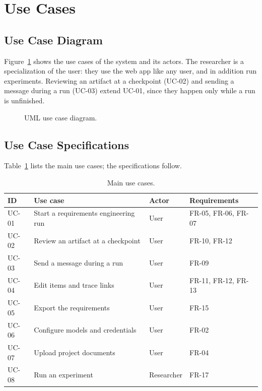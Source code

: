 \section{Use Cases}
\label{sec:sd-use-cases}

\subsection{Use Case Diagram}
\label{sec:sd-uc-diagram}
Figure~\ref{fig:sd-use-case} shows the use cases of the system and its actors. The researcher is a specialization of the user: they use the web app like any user, and in addition run experiments. Reviewing an artifact at a checkpoint (UC-02) and sending a message during a run (UC-03) extend UC-01, since they happen only while a run is unfinished.

\begin{figure}[H]
    \centering
    \resizebox{\linewidth}{!}{}
    \caption{UML use case diagram.}
    \label{fig:sd-use-case}
\end{figure}

\subsection{Use Case Specifications}
\label{sec:sd-uc-specs}
Table~\ref{tab:sd-uc-list} lists the main use cases; the specifications follow.

\begin{table}[H]
    \centering
    \caption{Main use cases.}
    \label{tab:sd-uc-list}
    \begin{tabularx}{\linewidth}{|l|X|l|l|}
        \hline
        \textbf{ID} & \textbf{Use case} & \textbf{Actor} & \textbf{Requirements} \\
        \hline
        UC-01 & Start a requirements engineering run & User & FR-05, FR-06, FR-07 \\
        UC-02 & Review an artifact at a checkpoint & User & FR-10, FR-12 \\
        UC-03 & Send a message during a run & User & FR-09 \\
        UC-04 & Edit items and trace links & User & FR-11, FR-12, FR-13 \\
        UC-05 & Export the requirements & User & FR-15 \\
        UC-06 & Configure models and credentials & User & FR-02 \\
        UC-07 & Upload project documents & User & FR-04 \\
        UC-08 & Run an experiment & Researcher & FR-17 \\
        \hline
    \end{tabularx}
\end{table}

